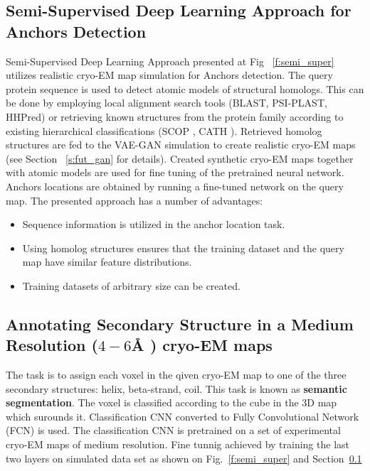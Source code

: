 \subsection{Semi-Supervised Deep Learning Approach for Anchors Detection }\label{s:fut_semi_super} 
Semi-Supervised Deep Learning Approach presented at Fig ~\ref{f:semi_super} utilizes realistic cryo-EM map simulation for Anchors detection.
The query protein sequence is used to detect atomic models of structural homologs. 
This can be done by employing local alignment search tools (BLAST, PSI-PLAST, HHPred) or retrieving known structures from the protein family according to existing hierarchical classifications (SCOP \cite{Hubbard1999}, CATH \cite{Orengo1997}).
Retrieved homolog structures are fed to  the VAE-GAN simulation to create realistic cryo-EM maps (see Section  ~\ref{s:fut_gan} for details).
Created synthetic cryo-EM maps together with atomic models are used for fine tuning of the pretrained neural network. 
Anchors locations are obtained by running a fine-tuned network on the query map.
The presented approach has a number of advantages:
\begin{itemize}
    \item Sequence information is utilized in the anchor location task.
    \item Using homolog structures ensures that the training dataset and the query map have similar feature distributions.
    \item Training datasets of arbitrary size can be created.
\end{itemize}

\subsection{Annotating Secondary Structure in a Medium Resolution ($4 -6${\AA} ) cryo-EM maps}
The task is to assign each voxel in the qiven cryo-EM map to one of the three secondary structures: helix, beta-strand, coil.
This task is known as \textbf{semantic segmentation}.
The voxel is classified according to the cube in  the 3D map which surounds it.
Classification CNN converted to   Fully Convolutional Network  (FCN) is used.
The classification CNN is pretrained on a set of experimental cryo-EM maps  of medium resolution.
Fine tunnig achieved by training the last two layers on simulated data set as shown on Fig.~\ref{f:semi_super} and Section~\ref{s:fut_semi_super}




